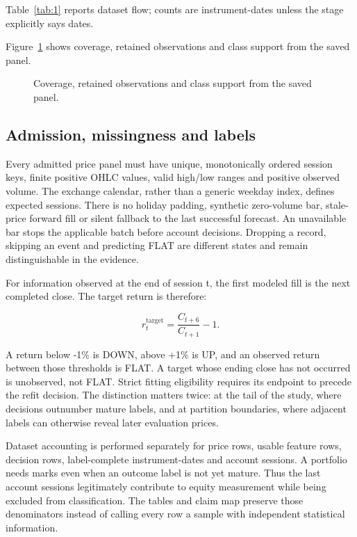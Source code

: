 \noindent Table~\ref{tab:1} reports dataset flow; counts are instrument-dates unless the stage explicitly says dates.



\noindent Figure~\ref{fig:1} shows coverage, retained observations and class support from the saved panel.

\begin{figure}[htbp]\centering

\caption{Coverage, retained observations and class support from the saved panel.}\label{fig:1}
\end{figure}

\subsection{Admission, missingness and labels}

Every admitted price panel must have unique, monotonically ordered session keys, finite positive OHLC values, valid high/low ranges and positive observed volume. The exchange calendar, rather than a generic weekday index, defines expected sessions. There is no holiday padding, synthetic zero-volume bar, stale-price forward fill or silent fallback to the last successful forecast. An unavailable bar stops the applicable batch before account decisions. Dropping a record, skipping an event and predicting FLAT are different states and remain distinguishable in the evidence.

For information observed at the end of session t, the first modeled fill is the next completed close. The target return is therefore:

\begin{equation}\label{eq:target}r^{\mathrm{target}}_t=\frac{C_{t+6}}{C_{t+1}}-1.\end{equation}

A return below -1\% is DOWN, above +1\% is UP, and an observed return between those thresholds is FLAT. A target whose ending close has not occurred is unobserved, not FLAT. Strict fitting eligibility requires its endpoint to precede the refit decision. The distinction matters twice: at the tail of the study, where decisions outnumber mature labels, and at partition boundaries, where adjacent labels can otherwise reveal later evaluation prices.

Dataset accounting is performed separately for price rows, usable feature rows, decision rows, label-complete instrument-dates and account sessions. A portfolio needs marks even when an outcome label is not yet mature. Thus the last account sessions legitimately contribute to equity measurement while being excluded from classification. The tables and claim map preserve those denominators instead of calling every row a sample with independent statistical information.

